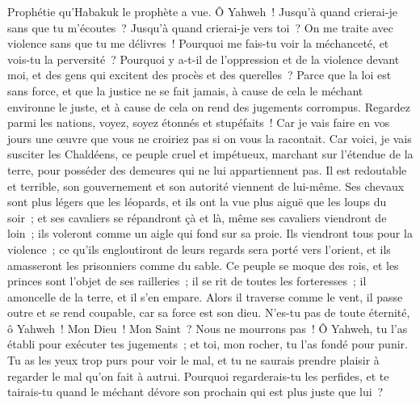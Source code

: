 \begin{multicols}{2}
\VerseOne{}Prophétie qu'Habakuk le prophète a vue.
Ô Yahweh~! Jusqu'à quand crierai-je sans que tu m'écoutes~? Jusqu'à quand crierai-je vers toi~? On me traite avec violence sans que tu me délivres~!
Pourquoi me fais-tu voir la méchanceté, et vois-tu la perversité~? Pourquoi y a-t-il de l'oppression et de la violence devant moi, et des gens qui excitent des procès et des querelles~?
Parce que la loi est sans force, et que la justice ne se fait jamais, à cause de cela le méchant environne le juste, et à cause de cela on rend des jugements corrompus.
Regardez parmi les nations, voyez, soyez étonnés et stupéfaits~! Car je vais faire en vos jours une œuvre que vous ne croiriez pas si on vous la racontait.
Car voici, je vais susciter les Chaldéens, ce peuple cruel et impétueux, marchant sur l'étendue de la terre, pour posséder des demeures qui ne lui appartiennent pas.
Il est redoutable et terrible, son gouvernement et son autorité viennent de lui-même.
Ses chevaux sont plus légers que les léopards, et ils ont la vue plus aiguë que les loups du soir~; et ses cavaliers se répandront çà et là, même ses cavaliers viendront de loin~; ils voleront comme un aigle qui fond sur sa proie.
Ils viendront tous pour la violence~; ce qu'ils engloutiront de leurs regards sera porté vers l'orient, et ils amasseront les prisonniers comme du sable.
Ce peuple se moque des rois, et les princes sont l'objet de ses railleries~; il se rit de toutes les forteresses~; il amoncelle de la terre, et il s'en empare.
Alors il traverse comme le vent, il passe outre et se rend coupable, car sa force est son dieu.
N'es-tu pas de toute éternité, ô Yahweh~! Mon Dieu~! Mon Saint~? Nous ne mourrons pas~! Ô Yahweh, tu l'as établi pour exécuter tes jugements~; et toi, mon rocher, tu l'as fondé pour punir.
Tu as les yeux trop purs pour voir le mal, et tu ne saurais prendre plaisir à regarder le mal qu'on fait à autrui. Pourquoi regarderais-tu les perfides, et te tairais-tu quand le méchant dévore son prochain qui est plus juste que lui~?

\end{multicols}

